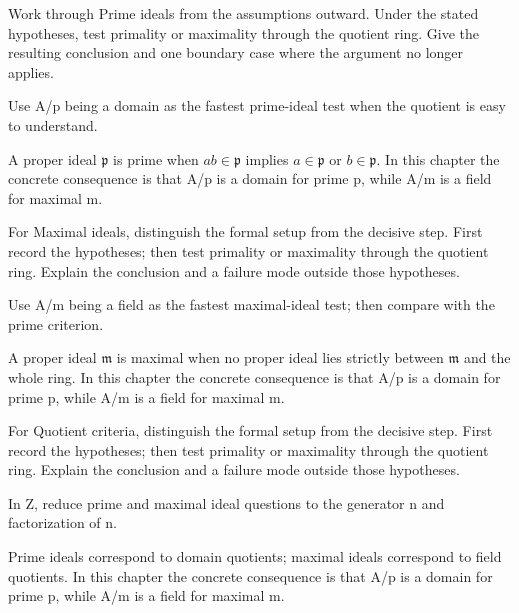 \begin{exercise}\label{exr:v02-01}
Work through Prime ideals from the assumptions outward. Under the stated hypotheses, test primality or maximality through the quotient ring. Give the resulting conclusion and one boundary case where the argument no longer applies.
\end{exercise}
\begin{hint}
Use A/p being a domain as the fastest prime-ideal test when the quotient is easy to understand.
\end{hint}
\begin{solution}
A proper ideal $\mathfrak p$ is prime when $ab\in\mathfrak p$ implies $a\in\mathfrak p$ or $b\in\mathfrak p$. In this chapter the concrete consequence is that A/p is a domain for prime p, while A/m is a field for maximal m.
\end{solution}

\begin{exercise}\label{exr:v02-02}
For Maximal ideals, distinguish the formal setup from the decisive step. First record the hypotheses; then test primality or maximality through the quotient ring. Explain the conclusion and a failure mode outside those hypotheses.
\end{exercise}
\begin{hint}
Use A/m being a field as the fastest maximal-ideal test; then compare with the prime criterion.
\end{hint}
\begin{solution}
A proper ideal $\mathfrak m$ is maximal when no proper ideal lies strictly between $\mathfrak m$ and the whole ring. In this chapter the concrete consequence is that A/p is a domain for prime p, while A/m is a field for maximal m.
\end{solution}

\begin{exercise}\label{exr:v02-03}
For Quotient criteria, distinguish the formal setup from the decisive step. First record the hypotheses; then test primality or maximality through the quotient ring. Explain the conclusion and a failure mode outside those hypotheses.
\end{exercise}
\begin{hint}
In Z, reduce prime and maximal ideal questions to the generator n and factorization of n.
\end{hint}
\begin{solution}
Prime ideals correspond to domain quotients; maximal ideals correspond to field quotients. In this chapter the concrete consequence is that A/p is a domain for prime p, while A/m is a field for maximal m.
\end{solution}


